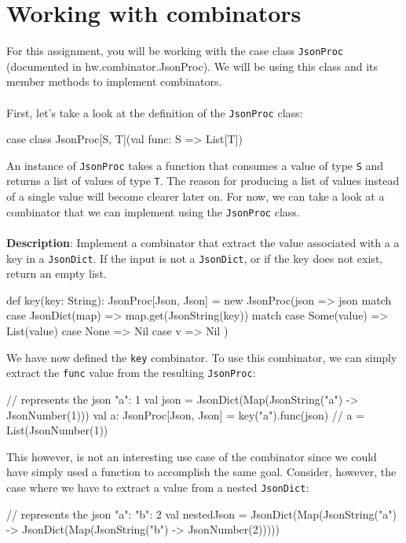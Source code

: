 \section{Working with combinators}
For this assignment, you will be working with the case class \texttt{JsonProc}
(documented in hw.combinator.JsonProc). We will be using this class and its 
member methods to implement combinators. 
\\ \\
\noindent First, let's take a look at the definition of the \texttt{JsonProc}
class:
\begin{scalacode}
case class JsonProc[S, T](val func: S => List[T])
\end{scalacode}
An instance of \texttt{JsonProc} takes a function that consumes a value of type
\texttt{S} and returns a list of values of type \texttt{T}. The reason for
producing a list of values instead of a single value will become clearer later
on. For now, we can take a look at a combinator that we can implement using
the \texttt{JsonProc} class. 
\\ \\
\noindent \textbf{Description}: Implement a combinator that extract the value
associated with a a key in a \texttt{JsonDict}. If the input is not a
\texttt{JsonDict}, or if the key does not exist, return an empty list.
\begin{scalacode}
def key(key: String): JsonProc[Json, Json] = new JsonProc(json => 
    json match {
      case JsonDict(map) => map.get(JsonString(key)) match {
        case Some(value) => List(value)
        case None => Nil
      }
      case v => Nil
    })
\end{scalacode}
We have now defined the \texttt{key} combinator. To use this combinator, we
can simply extract the \texttt{func} value from the resulting \texttt{JsonProc}:
\begin{scalacode}
// represents the json { "a": 1 }
val json = JsonDict(Map(JsonString("a") -> JsonNumber(1))) 
val a: JsonProc[Json, Json] = key("a").func(json) // a = List(JsonNumber(1))
\end{scalacode}
This however, is not an interesting use case of the combinator since we could
have simply used a function to accomplish the same goal. Consider, however, the
case where we have to extract a value from a nested \texttt{JsonDict}:
\begin{scalacode}
// represents the json { "a": { "b": 2 } }
val nestedJson = JsonDict(Map(JsonString("a") -> JsonDict(Map(JsonString("b") -> JsonNumber(2)))))
\end{scalacode}
